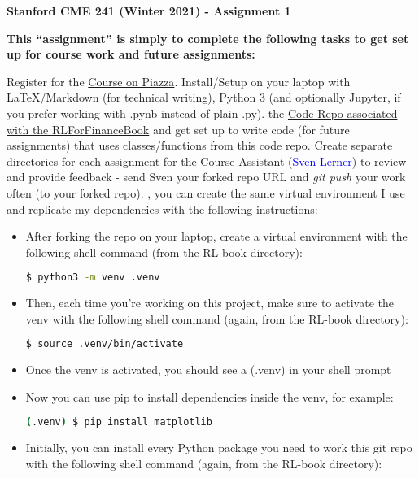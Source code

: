 \documentclass[12pt]{exam}
\begin{document}
\begin{center}
{\large {\bf Stanford CME 241 (Winter 2021) - Assignment 1}}
\end{center}
 
{\large{\bf This ``assignment'' is simply to complete the following tasks to get set up for course work and future assignments:}}
\begin{questions}
\question Register for the \href{https://piazza.com/stanford/winter2021/cme241/home}{Course on Piazza}.
\question Install/Setup on your laptop with LaTeX/Markdown (for technical writing), Python 3 (and optionally Jupyter, if you prefer working with .pynb instead of plain .py).
 the \href{https://github.com/TikhonJelvis/RL-book}{Code Repo associated with the RLForFinanceBook} and get set up to write code (for future assignments) that uses classes/functions from this code repo.
\question Create separate directories for each assignment for the Course Assistant (\href{mailto:svenl@stanford.edu}{\underline{\textcolor{blue}{Sven Lerner}}}) to review and provide feedback - send Sven your forked repo URL and {\em git push} your work often (to your forked repo).
, you can create the same virtual environment I use and replicate my dependencies with the following instructions:
\begin{itemize}
\item After forking the repo on your laptop, create a virtual environment with the following shell command (from the RL-book directory):
\begin{lstlisting}[language=bash]
$ python3 -m venv .venv
\end{lstlisting}
\item Then, each time you're working on this project, make sure to activate the venv with the following shell command (again, from the RL-book directory):
\begin{lstlisting}[language=bash]
$ source .venv/bin/activate
\end{lstlisting}
\item Once the venv is activated, you should see a (.venv) in your shell prompt
\item Now you can use pip to install dependencies inside the venv, for example:
\begin{lstlisting}[language=bash]
(.venv) $ pip install matplotlib
\end{lstlisting}
\item Initially, you can install every Python package you need to work this git repo with the following shell command (again, from the RL-book directory):

\end{itemize}
\end{questions}
\end{document}

